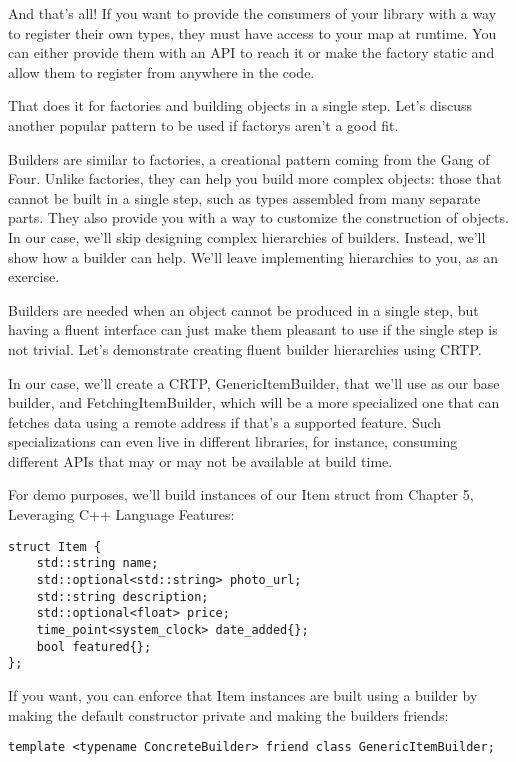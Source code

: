 And that's all! If you want to provide the consumers of your library with a way to register their own types, they must have access to your map at runtime. You can either provide them with an API to reach it or make the factory static and allow them to register from anywhere in the code.

That does it for factories and building objects in a single step. Let's discuss another popular pattern to be used if factorys aren't a good fit.


Builders are similar to factories, a creational pattern coming from the Gang of Four. Unlike factories, they can help you build more complex objects: those that cannot be built in a single step, such as types assembled from many separate parts. They also provide you with a way to customize the construction of objects. In our case, we'll skip designing complex hierarchies of builders. Instead, we'll show how a builder can help. We'll leave implementing hierarchies to you, as an exercise.

Builders are needed when an object cannot be produced in a single step, but having a fluent interface can just make them pleasant to use if the single step is not trivial. Let's demonstrate creating fluent builder hierarchies using CRTP.

In our case, we'll create a CRTP, GenericItemBuilder, that we'll use as our base builder, and FetchingItemBuilder, which will be a more specialized one that can fetches data using a remote address if that's a supported feature. Such specializations can even live in different libraries, for instance, consuming different APIs that may or may not be available at build time.

For demo purposes, we'll build instances of our Item struct from Chapter 5, Leveraging C++ Language Features:

\begin{lstlisting}[style=styleCXX]
struct Item {
	std::string name;
	std::optional<std::string> photo_url;
	std::string description;
	std::optional<float> price;
	time_point<system_clock> date_added{};
	bool featured{};
};
\end{lstlisting}

If you want, you can enforce that Item instances are built using a builder by making the default constructor private and making the builders friends:

\begin{lstlisting}[style=styleCXX]
template <typename ConcreteBuilder> friend class GenericItemBuilder;
\end{lstlisting}

